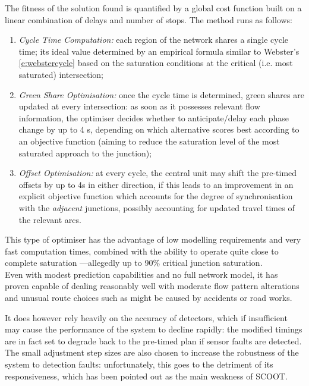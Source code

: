 The fitness of the solution found is quantified by a global cost function built on a linear combination of delays and number of stops. The method runs as follows:
\begin{enumerate}
\item \textit{Cycle Time Computation:} each region of the network shares a single cycle time; its ideal value determined by an empirical formula similar to Webster's \ref{e:webstercycle} based on the saturation conditions at the critical (i.e. most saturated) intersection;

\item \textit{Green Share Optimisation:} once the cycle time is determined, green shares are updated at every intersection: as soon as it possesses relevant flow information, the optimiser decides whether to anticipate/delay each phase change by up to 4 s, depending on which alternative scores best according to an objective function (aiming to reduce the saturation level of the most saturated approach to the junction);

\item \textit{Offset Optimisation:} at every cycle, the central unit may shift the pre-timed offsets by up to 4s in either direction, if this leads to an improvement in an explicit objective function which accounts for the degree of synchronisation with the \emph{adjacent} junctions, possibly accounting for updated travel times of the relevant arcs.
\end{enumerate}


This type of optimiser has the advantage of low modelling requirements and very fast computation times, combined with the ability to operate quite close to complete saturation —allegedly up to 90\% critical junction saturation.\\
Even with modest prediction capabilities and no full network model, it has proven capable of dealing reasonably well with moderate flow pattern alterations and unusual route choices such as might be caused by accidents or road works.

It does however rely heavily on the accuracy of detectors, which if insufficient may cause the performance of the system to decline rapidly: the modified timings are in fact set to degrade back to the pre-timed plan if sensor faults are detected.\\
The small adjustment step sizes are also chosen to increase the robustness of the system to detection faults: unfortunately, this goes to the detriment of its responsiveness, which has been pointed out as the main weakness of SCOOT.

